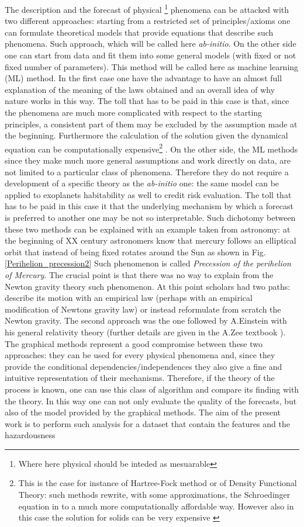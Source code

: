 \documentclass[12pt,%
               a4paper,%
               oneside,openany,%
               titlepage,%
               headinclude,footinclude,%
               BCOR5mm,%
               cleardoublepage=empty,%
               tablecaptionabove,%
               floatperchapter,
               ]{scrreprt}                 %
\begin{document}
The description and the forecast of physical \footnote{Where here physical should be inteded as mesuarable} phenomena can be attacked with two different approaches: starting from a restricted set of principles/axioms one can formulate theoretical models that provide equations that describe such phenomena. Such approach, which will be called here \textit{ab-initio}. On the other side one can start from data and fit them into some general models (with fixed or not fixed number of parameters). This method will be called here as machine learning (ML) method. In the first case one have the advantage to have an almost full explanation of the meaning of the laws obtained and an overall idea of why nature works in this way. The toll that has to be paid in this case is that, since the phenomena are much more complicated with respect to the starting principles, a consistent part of them may be excluded by the assumption made at the beginning. Furthermore the calculation of the solution given the dynamical equation can be computationally expensive\footnote{This is the case for instance of Hartree-Fock method or of Density Functional Theory: such methods rewrite, with some approximations, the Schroedinger equation in to a much more computationally affordable way. However also in this case the solution for solids can be very expensive \cite{martin_2004}} . On the other side, the ML methods since they make much more general assumptions and work directly on data, are not limited to a particular class of phenomena. Therefore they do not require a development of a specific theory as the \textit{ab-initio} one: the same model can be applied to exoplanets habitability as well to credit risk evaluation. The toll that has to be paid in this case it that the underlying mechanism by which a forecast is preferred to another one may be not so interpretable. Such dichotomy between these two methods can be explained with an example taken from astronomy: at the beginning of XX century astronomers know that mercury follows an elliptical orbit that instead of being fixed rotates around the Sun as shown in Fig. \ref{Perihelion_precession2} Such phenomenon is called \textit{Precession of the perihelion of Mercury}. The crucial point is that there was no way to explain from the Newton gravity theory such phenomenon. At this point scholars had two paths: describe its motion with an empirical law (perhaps with an empirical modification of Newtons gravity law) or instead reformulate from scratch the Newton gravity. The second approach was the one followed by A.Einstein with his general relativity theory (further details are given in the A.Zee textbook \cite{zee2013einstein}). The graphical methods represent a good compromise  between these two approaches: they can be used for every physical phenomena and, since they provide the conditional dependencies/independences they also give a fine and intuitive representation  of their mechanisms. Therefore, if the theory of the process is known, one can use this class of algorithm and compare its finding with the theory. In this way one can not only evaluate the quality of the forecasts, but also of the model provided by the graphical methods. The aim of the present work is to perform such analysis for a dataset that contain the features and the hazardousness 
\end{document}
